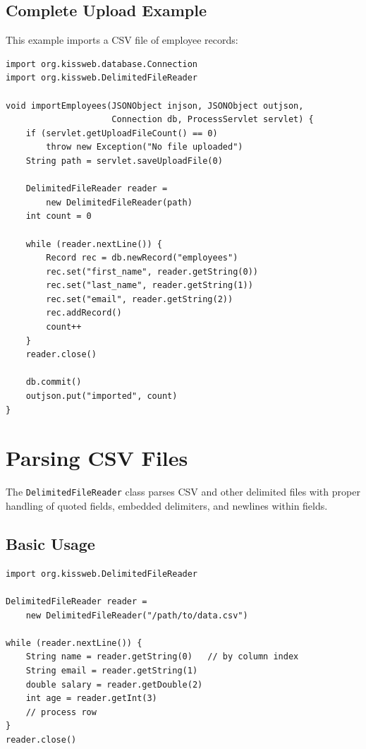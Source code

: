 \subsection{Complete Upload Example}

This example imports a CSV file of employee records:

\begin{lstlisting}[style=groovy]
import org.kissweb.database.Connection
import org.kissweb.DelimitedFileReader

void importEmployees(JSONObject injson, JSONObject outjson,
                     Connection db, ProcessServlet servlet) {
    if (servlet.getUploadFileCount() == 0)
        throw new Exception("No file uploaded")
    String path = servlet.saveUploadFile(0)

    DelimitedFileReader reader =
        new DelimitedFileReader(path)
    int count = 0

    while (reader.nextLine()) {
        Record rec = db.newRecord("employees")
        rec.set("first_name", reader.getString(0))
        rec.set("last_name", reader.getString(1))
        rec.set("email", reader.getString(2))
        rec.addRecord()
        count++
    }
    reader.close()

    db.commit()
    outjson.put("imported", count)
}
\end{lstlisting}

\section{Parsing CSV Files}
\label{sec:file-csv-read}

The \texttt{DelimitedFileReader} class parses CSV and other delimited files with proper handling of quoted fields, embedded delimiters, and newlines within fields.

\subsection{Basic Usage}

\begin{lstlisting}[style=groovy]
import org.kissweb.DelimitedFileReader

DelimitedFileReader reader =
    new DelimitedFileReader("/path/to/data.csv")

while (reader.nextLine()) {
    String name = reader.getString(0)   // by column index
    String email = reader.getString(1)
    double salary = reader.getDouble(2)
    int age = reader.getInt(3)
    // process row
}
reader.close()
\end{lstlisting}

